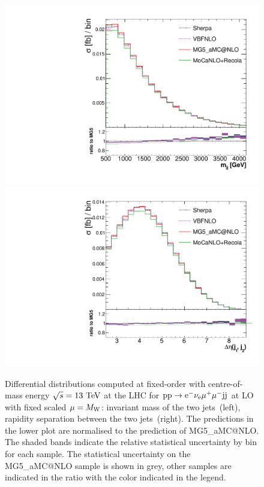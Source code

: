\documentclass[11pt]{cernrep}
\makeatletter
\newcommand{\MGaMC}{M\protect\scalebox{0.8}{AD}G\protect\scalebox{0.8}{RAPH}5\_aMC@NLO\xspace}
\makeatother
\begin{document}
\begin{figure}[htbp]
\begin{center}
   \includegraphics[scale=0.375]{figs/mjj_FixedOrder.pdf}
   \includegraphics[scale=0.375]{figs/dEtajj_FixedOrder.pdf}
\caption{Differential distributions computed at fixed-order with centre-of-mass energy $\sqrt{s}=13{\rm~TeV}$ at the LHC for ${\rm p} {\rm p}
  \to {\rm e}^-  \nu_{\rm e}  \mu^+ \mu^- {\rm j} {\rm j}$ at LO with fixed scaled $\mu = M_{\rm W}$: 
                invariant mass of the two jets~(left),
                rapidity separation between the two jets~(right).
                The predictions in the lower plot are normalised to the prediction of \MGaMC.
		The shaded bands indicate the relative statistical uncertainty by bin for each sample.
		The statistical uncertainty on the \MGaMC sample is shown in grey, other samples
		are indicated in the ratio with the color indicated in the legend.
                }
\label{vbs_fig_fixed_order}
\end{center}
\end{figure}
\end{document}
